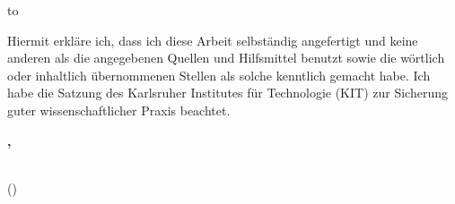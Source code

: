 %
%

\thispagestyle{empty}
\vspace*{31\baselineskip}
\hbox to \textwidth{\hrulefill}
\par



Hiermit erkläre ich, dass ich diese Arbeit selbständig angefertigt und keine anderen als
die angegebenen Quellen und Hilfsmittel benutzt sowie die wörtlich oder inhaltlich
übernommenen Stellen als solche kenntlich gemacht habe. Ich habe die Satzung
des Karlsruher Institutes für Technologie (KIT) zur Sicherung guter wissenschaftlicher Praxis beachtet.

\textbf{\submissionlocation, \submissiontime}
\vspace{1.5cm}

\dotfill\hspace*{8.0cm}\\
\hspace*{2cm}(\textbf{\myname}) %
